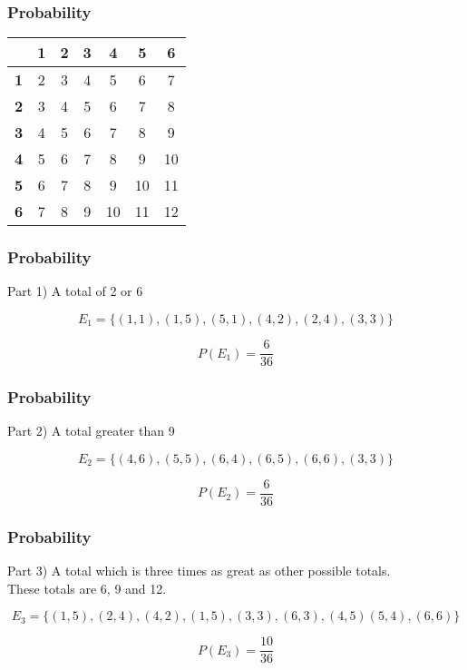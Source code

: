 \documentclass[IntroMain.tex]{subfiles}
\begin{document}
	\begin{frame}
		\frametitle{Probability}
		\large
		
		\begin{center}
			\begin{tabular}{|c||c|c|c|c|c|c|}
				\hline
				\phantom{space}	& \phantom{sp} \textbf{1}\phantom{sp}	&\phantom{sp} \textbf{2}\phantom{sp}&\phantom{sp} \textbf{3}\phantom{sp}	&\phantom{sp} \textbf{4}	\phantom{sp}&\phantom{sp} \textbf{5} \phantom{sp}&\phantom{sp}\textbf{6}	\phantom{sp}\\ \hline	\hline
				\textbf{1}	&	2	&	3	&	4	&	5	&	6	&	7	 \\ \hline	
				\textbf{2}	&	3	&	4	&	5	&	6	&	7	&	8	 \\ \hline	
				\textbf{3}	&	4	&	5	&	6	&	7	&	8	&	9	 \\ \hline	
				\textbf{4}	&	5	&	6	&	7	&	8	&	9	&	10	 \\ \hline	
				\textbf{5}	&	6	&	7	&	8	&	9	&	10	&	11	 \\ \hline	
				\textbf{6}	&	7	&	8	&	9	&	10	&	11	&	12	 \\ \hline	
			\end{tabular}
		\end{center}
		
	\end{frame}
	\begin{frame}
		\frametitle{Probability}
		\Large
		Part 1) A total of 2 or 6
		
		\[ E_1 = \{ (1,1) ,(1,5), (5,1), (4,2), (2,4), (3,3) \}  \]
		
		\[ P(E_1)  = \frac{6}{36} \]
		
	\end{frame}
	\begin{frame}
		\frametitle{Probability}
		\Large
		Part 2) A total greater than 9 
		
		\[ E_2 = \{ (4,6) , (5,5), (6,4), (6,5), (6,6), (3,3)\}  \]
		
		\[ P(E_2)  = \frac{6}{36} \]
		
	\end{frame}
	\begin{frame}
		\frametitle{Probability}
		\Large
		Part 3) A total which is three times as great as other possible totals. \\
		
		These totals are 6, 9 and 12.
		
		\[ E_3 = \{ (1,5) , (2,4), (4,2), (1,5), (3,3), (6,3), (4,5) (5,4) , (6,6) \}  \]
		
		\[ P(E_3)  = \frac{10}{36} \]
		
	\end{frame}
\end{document}
